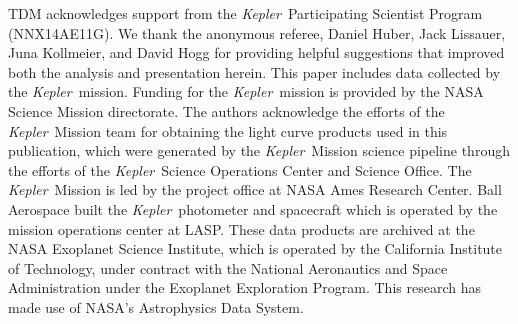 \documentclass{emulateapj}
\newcommand{\kepler}{\textit{Kepler}}
\begin{document}
\acknowledgments TDM acknowledges support from the \kepler\
Participating Scientist Program (NNX14AE11G). We thank the anonymous
referee, Daniel Huber, Jack Lissauer, Juna Kollmeier, and David Hogg 
for providing helpful suggestions that improved both the analysis and 
presentation herein.
This paper includes data collected by the \kepler\ mission. Funding for the \kepler\ mission
is provided by the NASA Science Mission directorate. The authors
acknowledge the efforts of the \kepler\ Mission team for obtaining
the light curve products used in
this publication, which were generated by the \kepler\ Mission
science pipeline through the efforts of the \kepler\ Science
Operations Center and Science Office. The \kepler\ Mission is led by
the project office at NASA Ames Research Center. Ball Aerospace built
the \kepler\ photometer and spacecraft which is operated by the
mission operations center at LASP. These data products are archived at
the NASA Exoplanet Science Institute, which is operated by the
California Institute of Technology, under contract with the National
Aeronautics and Space Administration under the Exoplanet Exploration
Program. This research has made use of NASA's Astrophysics Data
System. 

\clearpage

\clearpage
\end{document}

